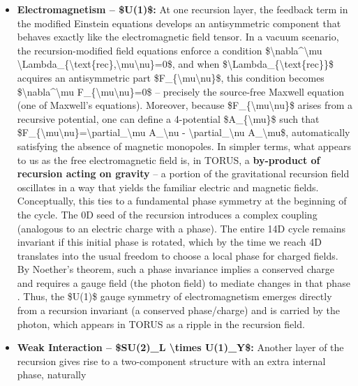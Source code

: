 \documentclass[]{article}
\begin{document}
\begin{itemize}
\item
  \textbf{Electromagnetism -- \$U(1)\$:} At one recursion layer, the
  feedback term in the modified Einstein equations develops an
  antisymmetric component that behaves exactly like the electromagnetic
  field tensor. In a vacuum scenario, the recursion-modified field
  equations enforce a condition
  \$\textbackslash{}nabla\^{}\textbackslash{}mu
  \textbackslash{}Lambda\_\{\textbackslash{}text\{rec\},\textbackslash{}mu\textbackslash{}nu\}=0\$,
  and when \$\textbackslash{}Lambda\_\{\textbackslash{}text\{rec\}\}\$
  acquires an antisymmetric part
  \$F\_\{\textbackslash{}mu\textbackslash{}nu\}\$, this condition
  becomes \$\textbackslash{}nabla\^{}\textbackslash{}mu
  F\_\{\textbackslash{}mu\textbackslash{}nu\}=0\$ -- precisely the
  source-free Maxwell equation (one of Maxwell's equations)​. Moreover,
  because \$F\_\{\textbackslash{}mu\textbackslash{}nu\}\$ arises from a
  recursive potential, one can define a 4-potential
  \$A\_\{\textbackslash{}mu\}\$ such that
  \$F\_\{\textbackslash{}mu\textbackslash{}nu\}=\textbackslash{}partial\_\textbackslash{}mu
  A\_\textbackslash{}nu - \textbackslash{}partial\_\textbackslash{}nu
  A\_\textbackslash{}mu\$, automatically satisfying the absence of
  magnetic monopoles​. In simpler terms, what appears to us as the free
  electromagnetic field is, in TORUS, a \textbf{by-product of recursion
  acting on gravity} -- a portion of the gravitational recursion field
  oscillates in a way that yields the familiar electric and magnetic
  fields​. Conceptually, this ties to a fundamental phase symmetry at
  the beginning of the cycle. The 0D seed of the recursion introduces a
  complex coupling (analogous to an electric charge with a phase). The
  entire 14D cycle remains invariant if this initial phase is rotated,
  which by the time we reach 4D translates into the usual freedom to
  choose a local phase for charged fields​. By Noether's theorem, such a
  phase invariance implies a conserved charge and requires a gauge field
  (the photon field) to mediate changes in that phase​. Thus, the
  \$U(1)\$ gauge symmetry of electromagnetism emerges directly from a
  recursion invariant (a conserved phase/charge) and is carried by the
  photon, which appears in TORUS as a ripple in the recursion field.
\item
  \textbf{Weak Interaction -- \$SU(2)\_L \textbackslash{}times
  U(1)\_Y\$:} Another layer of the recursion gives rise to a
  two-component structure with an extra internal phase, naturally

\end{itemize}
\end{document}
